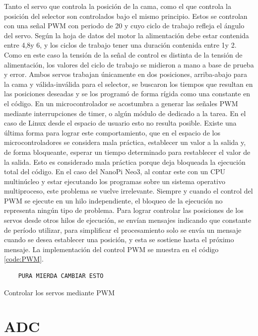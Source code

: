 \documentclass[12pt,letterpaper]{article}     %
\begin{document}
Tanto el servo que controla la posición de la cama, como el que controla la posición del selector
son controlados bajo el mismo principio. Estos se controlan con una señal PWM con periodo de 20\milli\second
y cuyo ciclo de trabajo refleja el ángulo del servo. Según la hoja de datos del motor la alimentación debe
estar contenida entre 4,8\volt y 6\volt, y los ciclos de trabajo tener una duración contenida entre 
1\milli\second y 2\milli\second. Como en este caso la tensión de la señal de control es distinta de la
tensión de alimentación, los valores del ciclo de trabajo se midieron a mano a base de prueba y error. 
Ambos servos trabajan únicamente en dos posiciones, arriba-abajo para la cama y válida-inválida para el 
selector, se buscaron los tiempos que resultan en las posiciones deseadas y se los programó de forma rígida
como una constante en el código.
En un microcontrolador se acostumbra a generar las señales PWM mediante interrupciones de timer, o algún
módulo de dedicado a la tarea. En el caso de Linux desde el espacio de usuario esto no resulta posible.
Existe una última forma para lograr este comportamiento, que en el espacio de los microcontroladores
se considera mala práctica, establecer un valor a la salida y, de forma bloqueante, esperar un tiempo
determinado para restablecer el valor de la salida. Esto es considerado mala práctica porque deja bloqueada
la ejecución total del código. En el caso del NanoPi Neo3, al contar este con un CPU multinúcleo y estar
ejecutando los programas sobre un sistema operativo multiproceso, este problema se vuelve irrelevante.
Siempre y cuando el control del PWM se ejecute en un hilo independiente, el bloqueo de la ejecución no
representa ningún tipo de problema. Para lograr controlar las posiciones de los servos desde otros hilos 
de ejecución, se envían mensajes indicando que constante de período utilizar, para simplificar el procesamiento
solo se envía un mensaje cuando se desea establecer una posición, y esta se sostiene hasta el próximo mensaje.
La implementación del control PWM se muestra en el código \ref{code:PWM}.

\begin{codigo}[!h]
	\begin{lstlisting}
	PURA MIERDA CAMBIAR ESTO
	\end{lstlisting}
	\caption{Controlar los servos mediante PWM}
	\label{code:PWM}
\end{codigo}

\section{ADC}
\end{document}
